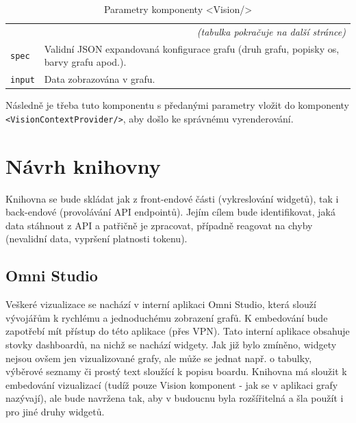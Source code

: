 \documentclass[czech, bc, kiv, he, iso690numb]{fasthesis}
\begin{document}
\begin{center}
	\begin{longtable}{p{}p{}}
	\caption{Parametry komponenty <Vision/>}
	\label{tab:visionParams}\\
	\toprule[1.5pt]
	\endhead
	\midrule
	\multicolumn{2}{r}{\textit{(tabulka pokračuje na další stránce)}}\\
	\endfoot
	\bottomrule[1.5pt]
	\endlastfoot
	\verb"spec" & Validní JSON expandovaná konfigurace grafu (druh grafu, popisky os, barvy grafu apod.). \\
	\midrule
	\verb"input" &  Data zobrazována v grafu. \\
	\end{longtable}
\end{center}

Následně je třeba tuto komponentu s předanými parametry vložit do komponenty \texttt{<VisionContextProvider/>}, aby došlo ke správnému vyrenderování.

\section{Návrh knihovny}

Knihovna se bude skládat jak z front-endové části (vykreslování widgetů), tak i back-endové (provolávání API endpointů). Jejím cílem bude identifikovat, jaká data stáhnout z API a patřičně je zpracovat, případně reagovat na chyby (nevalidní data, vypršení platnosti tokenu).
\subsection{Omni Studio}
Veškeré vizualizace se nachází v interní aplikaci Omni Studio, která slouží vývojářům k rychlému a jednoduchému zobrazení grafů. K embedování bude zapotřebí mít přístup do této aplikace (přes VPN). Tato interní aplikace
obsahuje stovky dashboardů, na nichž se nachází widgety. Jak již bylo zmíněno, widgety nejsou ovšem jen vizualizované grafy, ale může se jednat např. o tabulky, výběrové seznamy či prostý text sloužící k popisu boardu.
Knihovna má sloužit k embedování vizualizací (tudíž pouze Vision komponent - jak se v aplikaci grafy nazývají), ale bude navržena tak, aby v budoucnu byla rozšířitelná a šla použít i pro jiné druhy widgetů.
\end{document}
